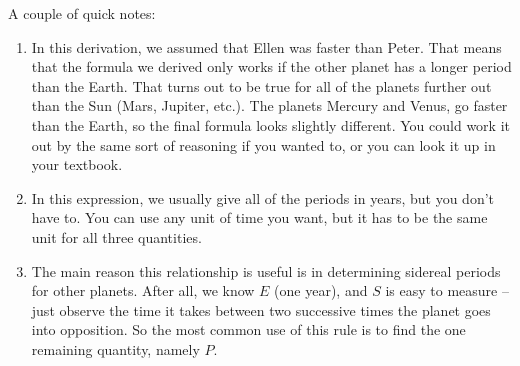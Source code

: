 A couple of quick notes:
\begin{enumerate}
\item In this derivation, we assumed that Ellen was faster than Peter.
That means that the formula we derived only works if the other
planet has a longer period than the Earth. That turns out to be true
for all of the planets further out than the Sun (Mars, Jupiter, etc.).
The planets Mercury and Venus, go faster than the Earth, so the
final formula looks slightly different. You could work it out by the
same sort of reasoning if you wanted to, or you can look it up in
your textbook.
\item In this expression, we usually give all of the periods in years, but
you don't have to. You can use any unit of time you want, but it has
to be the same unit for all three quantities.
\item The main reason this relationship is useful is in determining
sidereal periods for other planets. After all, we know $E$ (one year),
and $S$ is easy to measure -- just observe the time it takes between
two successive times the planet goes into opposition. So the
most common use of this rule is to find the one remaining quantity,
namely $P$.
\end{enumerate}




